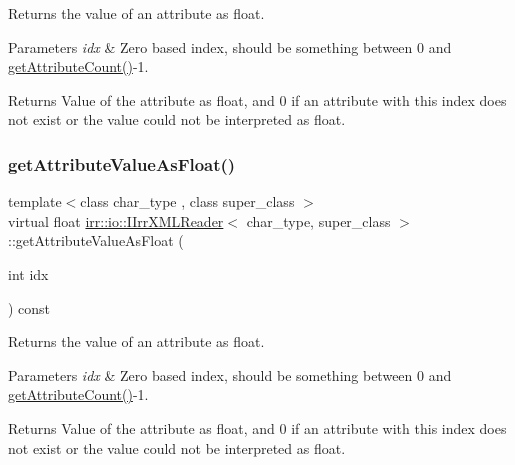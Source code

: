 Returns the value of an attribute as float. 


\begin{DoxyParams}{Parameters}
{\em idx} & Zero based index, should be something between 0 and \hyperlink{classirr_1_1io_1_1IIrrXMLReader_a8f85253d2efb15061facdb9571b9c549}{get\+Attribute\+Count()}-\/1. \\
\hline
\end{DoxyParams}
\begin{DoxyReturn}{Returns}
Value of the attribute as float, and 0 if an attribute with this index does not exist or the value could not be interpreted as float. 
\end{DoxyReturn}
\mbox{\label{classirr_1_1io_1_1IIrrXMLReader_a3a01b3cec9db01d00928074846d39add}} 
\subsubsection{\texorpdfstring{get\+Attribute\+Value\+As\+Float()}{getAttributeValueAsFloat()}\hspace{0.1cm}{\footnotesize\ttfamily [4/4]}}
{\footnotesize\ttfamily template$<$class char\+\_\+type , class super\+\_\+class $>$ \\
virtual float \hyperlink{classirr_1_1io_1_1IIrrXMLReader}{irr\+::io\+::\+I\+Irr\+X\+M\+L\+Reader}$<$ char\+\_\+type, super\+\_\+class $>$\+::get\+Attribute\+Value\+As\+Float (\begin{DoxyParamCaption}\item[{int}]{idx }\end{DoxyParamCaption}) const\hspace{0.3cm}{\ttfamily [pure virtual]}}



Returns the value of an attribute as float. 


\begin{DoxyParams}{Parameters}
{\em idx} & Zero based index, should be something between 0 and \hyperlink{classirr_1_1io_1_1IIrrXMLReader_a8f85253d2efb15061facdb9571b9c549}{get\+Attribute\+Count()}-\/1. \\
\hline
\end{DoxyParams}
\begin{DoxyReturn}{Returns}
Value of the attribute as float, and 0 if an attribute with this index does not exist or the value could not be interpreted as float. 
\end{DoxyReturn}
\mbox{\label{classirr_1_1io_1_1IIrrXMLReader_ab37bef58865355a7dba0011a38e6c8e7}} 
